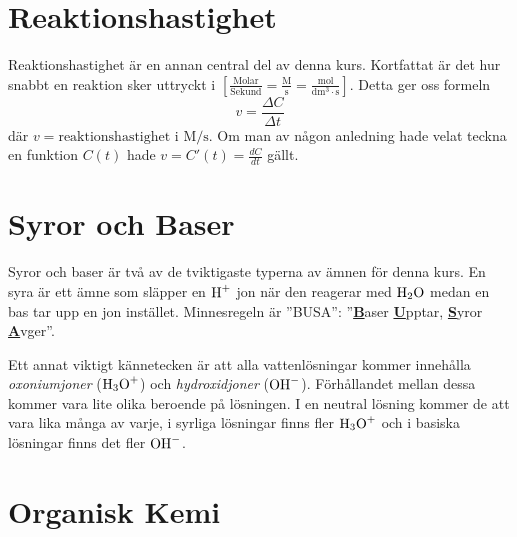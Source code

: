 \documentclass[12pt]{article}
\theoremstyle{definition}
\begin{document}
    
    \setcounter{exm}{0}
    
    
    \setcounter{exm}{0}

    \part{Reaktionshastighet}
    Reaktionshastighet är en annan central del av denna kurs. Kortfattat är det hur snabbt en reaktion sker uttryckt i $\mathrm{\left[\frac{Molar}{Sekund} = \frac{M}{s} = \frac{mol}{dm^3 \cdot s}\right]}$. Detta ger oss formeln 
    \begin{equation*}
        v = \frac{\Delta C}{\Delta t} 
    \end{equation*}
    där $v = \text{reaktionshastighet i } \mathrm{M/s}$. Om man av någon anledning hade velat teckna en funktion $C(t)$ hade $v = C'(t) = \frac{dC}{dt}$ gällt.

    
    \setcounter{exm}{0}

    \part{Syror och Baser}
    Syror och baser är två av de tviktigaste typerna av ämnen för denna kurs. En syra är ett ämne som släpper en $\ce{H+}$ jon när den reagerar med $\ce{H2O}$ medan en bas tar upp en jon instället. Minnesregeln är ''BUSA'': ''\underline{\textbf{B}}aser \underline{\textbf{U}}pptar, \underline{\textbf{S}}yror \underline{\textbf{A}}vger''.

    Ett annat viktigt kännetecken är att alla vattenlösningar kommer innehålla \emph{oxoniumjoner} ($\ce{H3O+}$) och \emph{hydroxidjoner} ($\ce{OH-}$). Förhållandet mellan dessa kommer vara lite olika beroende på lösningen. I en neutral lösning kommer de att vara lika många av varje, i syrliga lösningar finns fler $\ce{H3O+}$ och i basiska lösningar finns det fler $\ce{OH-}$.

    

    \part{Organisk Kemi}


    
\end{document}
